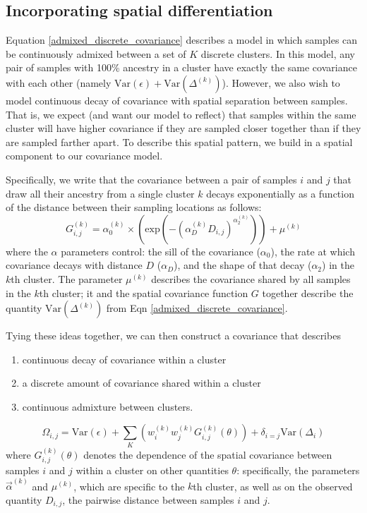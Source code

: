 \documentclass[12pt]{article}
\begin{document}
\subsection{Incorporating spatial differentiation}
Equation \ref{admixed_discrete_covariance} describes a model in which 
samples can be continuously admixed between a set of $K$ discrete clusters.
In this model, any pair of samples with 100\% ancestry in a cluster 
have exactly the same covariance with each other (namely $\text{Var}(\epsilon) + \text{Var}(\Delta^{(k)})$).
However, we also wish to model continuous decay of covariance with spatial separation between samples.
That is, we expect (and want our model to reflect) that samples within the same cluster 
will have higher covariance if they are sampled closer together than if they are sampled farther apart.
To describe this spatial pattern, we build in a spatial component to our covariance model.

Specifically, we write that the covariance between a pair of samples $i$ and $j$
that draw all their ancestry from a single cluster $k$ decays exponentially as a function 
of the distance between their sampling locations as follows:
\begin{equation}
G^{(k)}_{i,j} = \alpha^{(k)}_0 \times \left(\text{exp} \left(  -(\alpha^{(k)}_D D_{i,j})^{\alpha^{(k)}_2}\right) \right) + \mu^{(k)}	
\label{spatial_cov}
\end{equation}
where the $\alpha$ parameters control: 
the sill of the covariance ($\alpha_0$), 
the rate at which covariance decays with distance $D$ ($\alpha_D$),
and the shape of that decay ($\alpha_2$)
in the $k$th cluster.
The parameter $\mu^{(k)}$ describes the covariance shared by all samples in the $k$th cluster;
it and the spatial covariance function $G$ together
 describe the quantity $\text{Var}(\Delta^{(k)})$ from Eqn \eqref{admixed_discrete_covariance}.

Tying these ideas together, we can then construct a covariance that describes
\begin{enumerate}
\item continuous decay of covariance within a cluster
\item a discrete amount of covariance shared within a cluster
\item continuous admixture between clusters.
\end{enumerate}

\begin{equation}
\Omega_{i,j} = \text{Var}(\epsilon) + \sum\limits_K \left(	w^{(k)}_iw^{(k)}_j G^{(k)}_{i,j}(\theta) 	\right) +
\delta_{i=j} \text{Var}(\Delta_i)
\label{admixed_spatial_cov}
\end{equation}
%
where $G^{(k)}_{i,j}(\theta)$ denotes the dependence of the spatial covariance between samples $i$ and $j$ 
within a cluster on other quantities $\theta$: 
specifically, the parameters $\vec{\alpha}^{(k)}$ and $\mu^{(k)}$, which are specific to the $k$th cluster, 
as well as on the observed quantity $D_{i,j}$, the pairwise distance between samples $i$ and $j$.
\end{document}
